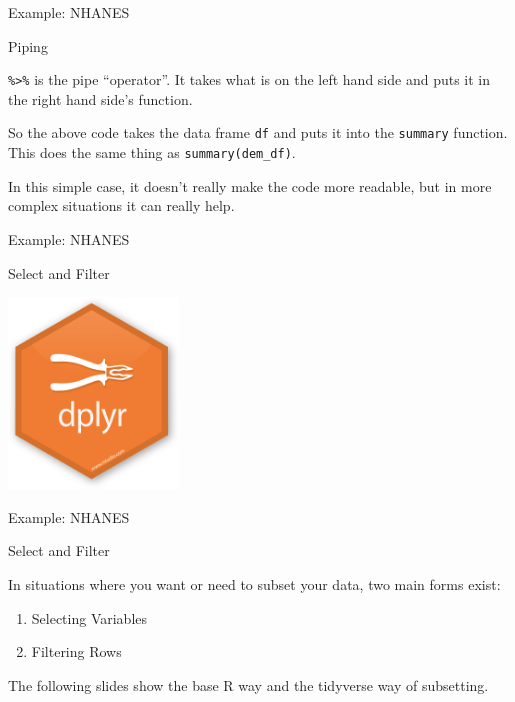 \begin{frame}[fragile]{Example: NHANES}

\begin{block}{Piping}

\texttt{\%\textgreater{}\%} is the pipe ``operator''. It takes what is
on the left hand side and puts it in the right hand side's function.

\begin{Shaded}
\end{Shaded}

So the above code takes the data frame \texttt{df} and puts it into the
\texttt{summary} function. This does the same thing as
\texttt{summary(dem\_df)}.

In this simple case, it doesn't really make the code more readable, but
in more complex situations it can really help.

\end{block}

\end{frame}

\begin{frame}{Example: NHANES}

\begin{block}{Select and Filter}

\centering  \includegraphics[height=2in]{Figures/dplyr_logo.png}

\end{block}

\end{frame}

\begin{frame}{Example: NHANES}

\begin{block}{Select and Filter}

In situations where you want or need to subset your data, two main forms
exist:

\begin{enumerate}
\def\labelenumi{\arabic{enumi}.}
\tightlist
\item
  Selecting Variables
\item
  Filtering Rows
\end{enumerate}

The following slides show the base R way and the tidyverse way of
subsetting.

\end{block}

\end{frame}

